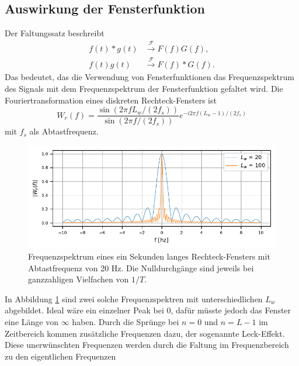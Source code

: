 \subsection{Auswirkung der Fensterfunktion}
Der Faltungssatz beschreibt 
\begin{align}
    f(t) * g(t)& \xrightarrow{\mathscr{F}} F(f)G(f),\\
    f(t) g(t)&\xrightarrow{\mathscr{F}}F(f) * G(f).
\end{align}
Das bedeutet, das die Verwendung von Fensterfunktionen das Frequenzspektrum
des Signals mit dem Frequenzspektrum der Fensterfunktion gefaltet wird.
Die Fouriertransformation eines diskreten Rechteck-Fensters ist 
\begin{equation}
    W_r(f) = \frac{\sin(2 \pi f  L_w / (2 f_s))}{\sin(2 \pi f / (2 f_s))} e^{-i 2 \pi f (L_w-1)/(2f_s)}
\end{equation}
mit $f_s$ als Abtastfrequenz.
\begin{figure}
    \centering
    \includegraphics{papers/sonogramm/images/rect_freq.pdf}
    \caption{Frequenzspektrum eines ein Sekunden langes Rechteck-Fensters mit Abtastfrequenz von 20 Hz. Die Nulldurchgänge sind jeweils bei ganzzahligen Vielfachen
    von $1/T$.
    \label{sonogramm:rectfreq}
    }
\end{figure}
In Abbildung \ref{sonogramm:rectfreq} sind zwei solche Frequenzspektren mit unterschiedlichen $L_w$ abgebildet.
Ideal wäre ein einzelner Peak bei 0, dafür müsste jedoch das Fenster eine Länge von $\infty$ haben.
Durch die Sprünge bei $n = 0$ und $n = L-1$ im Zeitbereich kommen zusätzliche Frequenzen dazu, der sogenannte
Leck-Effekt.
Diese unerwünschten Frequenzen werden durch die Faltung im Frequenzbereich zu den eigentlichen Frequenzen 
